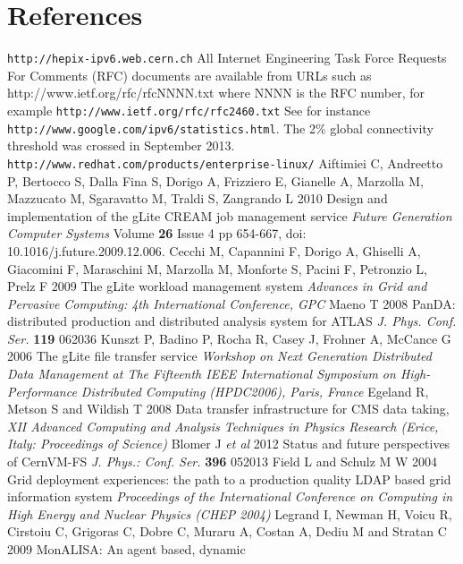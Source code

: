 \section*{References}

\begin{thebibliography}{1}
 {\tt http://hepix-ipv6.web.cern.ch}
 All Internet Engineering Task Force Requests For Comments (RFC) documents are available
from URLs such as http://www.ietf.org/rfc/rfcNNNN.txt where NNNN is the RFC number, for example {\tt http://www.ietf.org/rfc/rfc2460.txt}
 See for instance {\tt http://www.google.com/ipv6/statistics.html}. The 2\% global connectivity threshold was crossed in September 2013.
 {\tt http://www.redhat.com/products/enterprise-linux/}
Aiftimiei C, Andreetto P, Bertocco S, Dalla Fina S, Dorigo A,
Frizziero E, Gianelle A, Marzolla M, Mazzucato M, Sgaravatto M,
Traldi S, Zangrando L 2010 Design and implementation of the gLite CREAM job
management service {\it Future Generation Computer Systems} Volume {\bf 26} Issue
4 pp 654-667, doi: 10.1016/j.future.2009.12.006.
Cecchi M, Capannini F, Dorigo A, Ghiselli A, Giacomini F, Maraschini M, Marzolla M, Monforte S, Pacini F, Petronzio L, Prelz F 2009 The gLite workload management system {\it Advances in Grid and Pervasive Computing: 4th International Conference, GPC}
Maeno T 2008 PanDA: distributed production and distributed analysis
system for ATLAS {\it J. Phys. Conf. Ser.} {\bf 119} 062036
Kunszt P, Badino P, Rocha R, Casey J, Frohner A, McCance G 2006 The gLite file transfer service
{\it Workshop on Next Generation Distributed Data Management at The Fifteenth IEEE International Symposium on High-Performance Distributed Computing (HPDC2006), Paris, France}
Egeland R, Metson S and  Wildish T 2008 Data transfer infrastructure for
CMS data taking,  {\it XII Advanced Computing and Analysis Techniques in
Physics Research (Erice, Italy: Proceedings of Science)}
Blomer J {\it et al} 2012 Status and future perspectives of CernVM-FS
{\it J. Phys.: Conf. Ser.} {\bf396} 052013
Field L and Schulz M W 2004  Grid deployment experiences: the path to a production quality LDAP based grid information system {\it Proceedings of the International Conference on Computing in High Energy and Nuclear Physics (CHEP 2004)}
Legrand I, Newman H, Voicu R, Cirstoiu C, Grigoras C, Dobre C, Muraru A,
Costan A, Dediu M and Stratan C 2009 MonALISA: An agent based, dynamic

\end{thebibliography}

